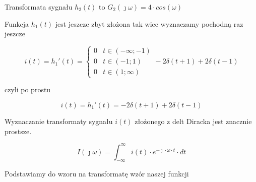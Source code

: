 \begin{task}
Transformata sygnału $h_2(t)$ to $G_2(\jmath \omega)=4 \cdot cos\left( \omega\right)$

Funkcja $h_1(t)$ jest jeszcze zbyt złożona tak wiec wyznaczamy pochodną raz jeszcze 

\begin{equation}
i(t)=h_1'(t)=\begin{cases}
0 & t \in \left( -\infty; -1 \right ) \\
0 & t \in \left( -1; 1 \right ) \\
0 & t \in \left( 1; \infty \right )
\end{cases} - 2 \delta(t+1) + 2 \delta(t-1)
\end{equation}

czyli po prostu

\begin{equation}
i(t)=h_1'(t)= -2 \delta(t+1) + 2 \delta(t-1)
\end{equation}

\begin{figure}[H]
  \centering
\end{figure}

Wyznaczanie transformaty sygnału $i(t)$ złożonego z delt Diracka jest znacznie prostsze. 

\begin{equation}
I(\jmath \omega )=\int_{-\infty }^{\infty}i(t) \cdot e^{-\jmath \cdot \omega \cdot t}\cdot dt
\end{equation}

Podstawiamy do wzoru na transformatę wzór naszej funkcji



\end{task}
